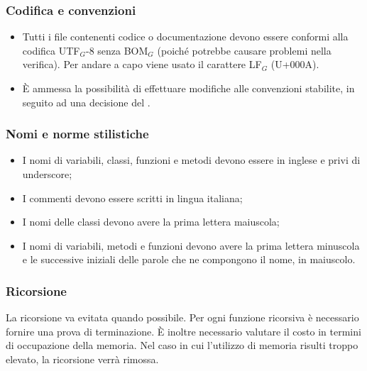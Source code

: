 \subsubsection{Codifica e convenzioni}
\begin{itemize}
	\item Tutti i file contenenti codice o documentazione devono essere conformi alla codifica UTF$_G$-8 senza BOM$_G$ (poiché potrebbe causare problemi nella verifica). Per andare a capo viene usato il carattere LF$_G$ (U+000A).
	\item È ammessa la possibilità di effettuare modifiche alle convenzioni stabilite, in seguito ad una decisione del \ruoloResponsabile .
\end{itemize}

\subsubsection{Nomi e norme stilistiche}
\begin{itemize}
	\item I nomi di variabili, classi, funzioni e metodi devono essere in inglese e privi di underscore;
	\item I commenti devono essere scritti in lingua italiana;
	\item I nomi delle classi devono avere la prima lettera maiuscola;
	\item I nomi di variabili, metodi e funzioni devono avere la prima lettera minuscola e le successive iniziali delle parole che ne compongono il nome, in maiuscolo.
\end{itemize}

\subsubsection{Ricorsione}
La ricorsione va evitata quando possibile. Per ogni funzione ricorsiva è necessario
fornire una prova di terminazione. È inoltre necessario valutare il costo in termini di
occupazione della memoria. Nel caso in cui l’utilizzo di memoria risulti troppo elevato, la ricorsione verrà rimossa.

